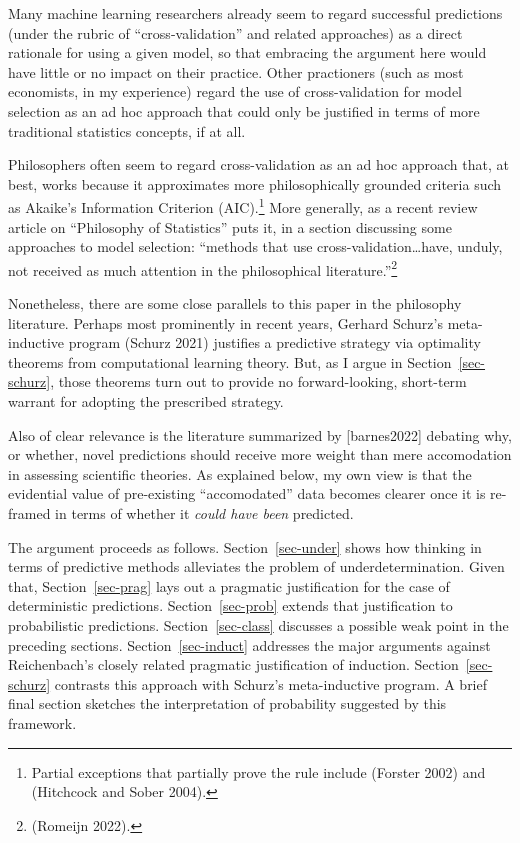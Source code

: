 \documentclass[
  letterpaper,
  DIV=11,
  numbers=noendperiod]{scrartcl}
\theoremstyle{definition}
\theoremstyle{remark}
\begin{document}
Many machine learning researchers already seem to regard successful
predictions (under the rubric of ``cross-validation'' and related
approaches) as a direct rationale for using a given model, so that
embracing the argument here would have little or no impact on their
practice. Other practioners (such as most economists, in my experience)
regard the use of cross-validation for model selection as an ad hoc
approach that could only be justified in terms of more traditional
statistics concepts, if at all.

Philosophers often seem to regard cross-validation as an ad hoc approach
that, at best, works because it approximates more philosophically
grounded criteria such as Akaike's Information Criterion
(AIC).\footnote{Partial exceptions that partially prove the rule include
  (Forster 2002) and (Hitchcock and Sober 2004).} More generally, as a
recent review article on ``Philosophy of Statistics'' puts it, in a
section discussing some approaches to model selection: ``methods that
use cross-validation\ldots have, unduly, not received as much attention
in the philosophical literature.''\footnote{(Romeijn 2022).}

Nonetheless, there are some close parallels to this paper in the
philosophy literature. Perhaps most prominently in recent years, Gerhard
Schurz's meta-inductive program (Schurz 2021) justifies a predictive
strategy via optimality theorems from computational learning theory.
But, as I argue in Section~\ref{sec-schurz}, those theorems turn out to
provide no forward-looking, short-term warrant for adopting the
prescribed strategy.

Also of clear relevance is the literature summarized by {[}barnes2022{]}
debating why, or whether, novel predictions should receive more weight
than mere accomodation in assessing scientific theories. As explained
below, my own view is that the evidential value of pre-existing
``accomodated'' data becomes clearer once it is re-framed in terms of
whether it \emph{could have been} predicted.

The argument proceeds as follows. Section~\ref{sec-under} shows how
thinking in terms of predictive methods alleviates the problem of
underdetermination. Given that, Section~\ref{sec-prag} lays out a
pragmatic justification for the case of deterministic predictions.
Section~\ref{sec-prob} extends that justification to probabilistic
predictions. Section~\ref{sec-class} discusses a possible weak point in
the preceding sections. Section~\ref{sec-induct} addresses the major
arguments against Reichenbach's closely related pragmatic justification
of induction. Section~\ref{sec-schurz} contrasts this approach with
Schurz's meta-inductive program. A brief final section sketches the
interpretation of probability suggested by this framework.
\end{document}
